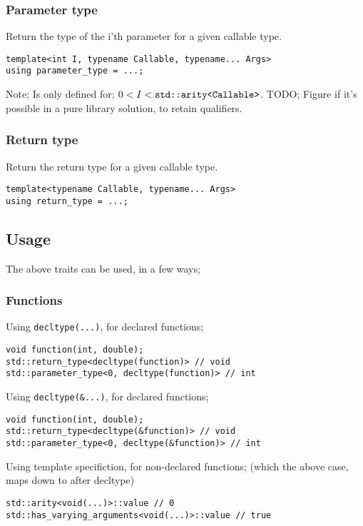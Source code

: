 \subsubsection{Parameter type}
Return the type of the i'th parameter for a given callable type.
\begin{verbatim}
template<int I, typename Callable, typename... Args>
using parameter_type = ...;
\end{verbatim}
Note; Is only defined for; $0 < I < \verb|std::arity<Callable>|$.
\newline
TODO; Figure if it's possible in a pure library solution, to retain qualifiers. 

\subsubsection{Return type}
Return the return type for a given callable type.
\begin{verbatim}
template<typename Callable, typename... Args>
using return_type = ...;
\end{verbatim}

\subsection{Usage}
The above traits can be used, in a few ways;
\subsubsection{Functions}
Using \verb|decltype(...)|, for declared functions;
\begin{verbatim}
void function(int, double);
std::return_type<decltype(function)> // void
std::parameter_type<0, decltype(function)> // int
\end{verbatim}
Using \verb|decltype(&...)|, for declared functions;
\begin{verbatim}
void function(int, double);
std::return_type<decltype(&function)> // void
std::parameter_type<0, decltype(&function)> // int
\end{verbatim}
Using template specifiction, for non-declared functions;
(which the above case, maps down to after decltype)
\begin{verbatim}
std::arity<void(...)>::value // 0
std::has_varying_arguments<void(...)>::value // true
\end{verbatim}

